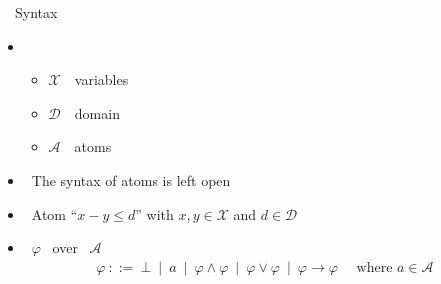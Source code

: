 \newcommand{\Variables}{\ensuremath{\mathcal{X}}}
\newcommand{\Domain}{\ensuremath{\mathcal{D}}}
\newcommand{\Atoms}{\ensuremath{\mathcal{A}}}
\newcommand{\ThAt}{\mathit{a}}
\newcommand{\Undefined}{\ensuremath{\boldsymbol{u}}}
\newcommand{\val}{v}
\newcommand{\den}[1]{\llbracket \, #1 \, \rrbracket}

\begin{frame}{\HTC\ \ Syntax}
  \begin{itemize}
  \item {} \ \tuple{\Variables,\Domain,\Atoms}
    \begin{itemize}
    \item \Variables\ \ variables
    \item \Domain\    \ domain
    \item \Atoms\     \ atoms
    \end{itemize}
    \smallskip
  \item<2->  \ The syntax of atoms is left open
  \item<2->  \ Atom ``$x - y \leq d$'' with $x, y \in \Variables$ and $d \in \Domain$
    \medskip
  \item<3->  \ $\varphi$ \ over \ \Atoms\
    \begin{align*}
      \varphi \ ::= \ \bot \ \mid \ \ThAt\ \mid \ \varphi \land \varphi \ \mid \  \varphi \lor \varphi \ \mid \  \varphi \rightarrow \varphi \quad\text{ where } \ThAt \in \Atoms
    \end{align*}

  \end{itemize}
\end{frame}
